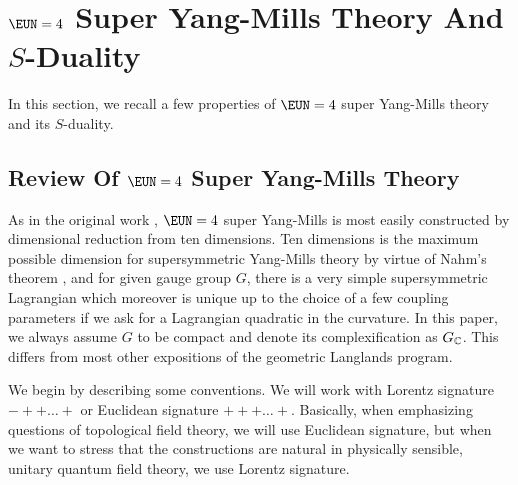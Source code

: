 
\section{${\EUN}=4$ Super Yang-Mills Theory And $S$-Duality}

\label{sec:review}

 

 In this section, we recall a few properties of
${\EUN}=4$ super Yang-Mills theory and its $S$-duality.

\subsection{Review Of ${\EUN}=4$ Super Yang-Mills Theory}
\label{sec:reviewsym}

As in the original work \cite{ref42}, ${\EUN}=4$ super Yang-Mills is
most easily constructed by dimensional reduction from ten
dimensions. Ten dimensions is the maximum possible dimension for
supersymmetric Yang-Mills theory  by virtue of Nahm's theorem
\cite{ref43}, and for given gauge group $G$, there is a very simple
supersymmetric Lagrangian which moreover is  unique up to the
choice of a few coupling parameters if we ask for a Lagrangian
quadratic in the curvature. In this paper, we always assume $G$ to
be compact and denote its complexification as $G_{\Bbb{C}}$.  This
differs from most other expositions of the geometric Langlands
program.

  
  
  

  

\par{}

 

We begin by describing some conventions. We will work with Lorentz
signature $-++\dots +$ or Euclidean signature $+++\dots +$.
Basically, when  emphasizing questions of topological field
theory, we will use Euclidean signature, but when we want to
stress that the constructions are natural in physically sensible,
unitary quantum field theory, we use Lorentz signature.

